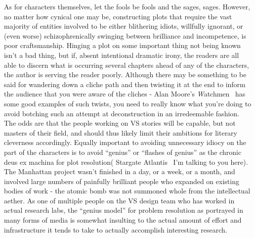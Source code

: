 As for characters themselves, let the fools be fools and the sages,
sages. However, no matter how cynical one may be, constructing plots
that require the vast majority of entities involved to be either
blithering idiots, willfully ignorant, or (even worse)
schizophrenically swinging between brilliance and incompetence, is
poor craftsmanship. Hinging a plot on some important thing not being
known isn't a bad thing, but if, absent intentional dramatic irony,
the readers are all able to discern what is occurring several chapters
ahead of any of the characters, the author is serving the reader
poorly. Although there may be something to be said for wandering down
a cliche path and then twisting it at the end to inform the audience
that you were aware of the cliches - Alan Moore's {\emph
Watchmen}~\cite{Moore-Watchmen} has some good examples of such twists,
you need to really know what you're doing to avoid botching such an
attempt at deconstruction in an irredeemable fashion. The odds are that
the people working on VS stories will be capable, but not masters of
their field, and should thus likely limit their ambitions for literary
cleverness accordingly. Equally important to avoiding unnecessary
idiocy on the part of the characters is to avoid ``genius'' or
``flashes of genius'' as the chronic deus ex machina for plot
resolution( Stargate Atlantis~\cite{StargateAtlantis} I'm talking to
you here). The Manhattan project wasn't finished in a day, or a week,
or a month, and involved large numbers of painfully brilliant people
who expanded on existing bodies of work - the atomic bomb was not
summoned whole from the intellectual aether. As one of multiple people
on the VS design team who has worked in actual research labs, the
``genius model'' for problem resolution as portrayed in many forms of
media is somewhat insulting to the actual amount of effort and
infrastructure it tends to take to actually accomplish interesting
research. 

